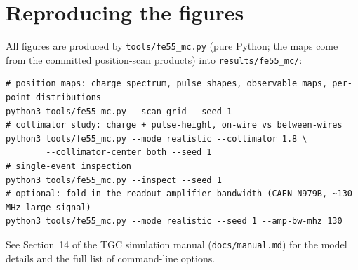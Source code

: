 \documentclass[11pt,a4paper]{article}
\begin{document}
\appendix
\section{Reproducing the figures}
All figures are produced by \texttt{tools/fe55\_mc.py} (pure Python; the maps come from the committed
position-scan products) into \texttt{results/fe55\_mc/}:
{\footnotesize
\begin{verbatim}
# position maps: charge spectrum, pulse shapes, observable maps, per-point distributions
python3 tools/fe55_mc.py --scan-grid --seed 1
# collimator study: charge + pulse-height, on-wire vs between-wires
python3 tools/fe55_mc.py --mode realistic --collimator 1.8 \
        --collimator-center both --seed 1
# single-event inspection
python3 tools/fe55_mc.py --inspect --seed 1
# optional: fold in the readout amplifier bandwidth (CAEN N979B, ~130 MHz large-signal)
python3 tools/fe55_mc.py --mode realistic --seed 1 --amp-bw-mhz 130
\end{verbatim}
}
See Section~14 of the TGC simulation manual (\texttt{docs/manual.md}) for the model details and the full
list of command-line options.
\end{document}
